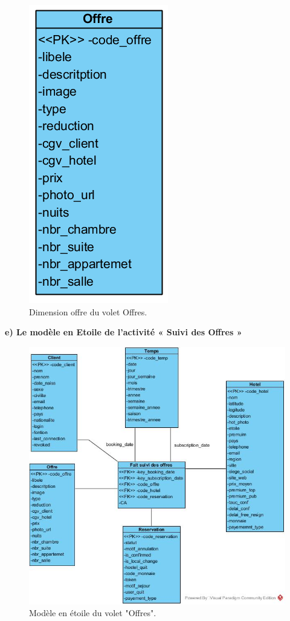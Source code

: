 \begin{figure}[!htbp]
	\begin{center}
		\includegraphics[scale=0.65]{images/dim_offre.png}
		\caption{Dimension offre du volet Offres.}
		\label{use_bi_tools}
	\end{center}
	\end{figure}
	
\cleardoublepage
\textbf{e) Le modèle en Etoile de l’activité « Suivi des Offres »}\\

\begin{figure}[!htbp]
	\begin{center}
		\includegraphics[scale=0.55]{images/star_offres.png}
		\caption{Modèle en étoile du volet "Offres".}
		\label{use_bi_tools}
	\end{center}
	\end{figure}


